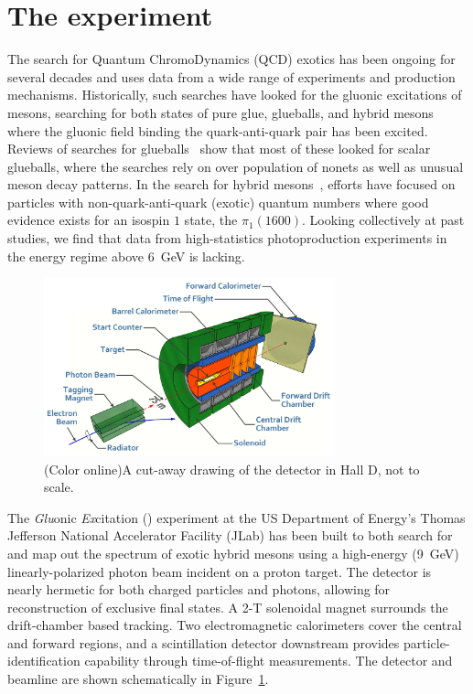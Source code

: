 \section[The \gx{} experiment]{\label{sec:gluexexperiment} The \gx{} experiment}
The search for Quantum ChromoDynamics (QCD) exotics has been ongoing for several decades and uses data from a wide range of experiments and production mechanisms. Historically, such searches have looked for the gluonic excitations of mesons, searching for both states of pure glue, glueballs, and hybrid mesons where the gluonic field binding the quark-anti-quark pair has been excited. Reviews of searches for glueballs~\cite{Crede:2008vw} show that most of these looked for scalar glueballs, where the searches rely on over population of nonets as well as unusual meson decay patterns. In the search for hybrid mesons~\cite{Meyer:2010ku,Meyer:2015eta}, efforts have focused on particles with non-quark-anti-quark (exotic) quantum numbers where good evidence exists for an isospin $1$ state, the $\pi_{1}(1600)$. Looking collectively at past studies, we find that data from high-statistics photoproduction experiments in the energy regime above $6$~GeV is lacking. 

\begin{figure}[h!]\centering
\includegraphics[width=0.75\textwidth]{figures/GlueX-graphic.jpg}
\caption[]{\label{fig:gluex_cut-away}(Color online)A cut-away drawing of the \GX{} detector in Hall D, not to scale.}
\end{figure}
The \emph{Glu}onic \emph{Ex}citation (\gx{}) experiment at the 
US Department of Energy's Thomas Jefferson National Accelerator Facility (JLab) \cite{jlab-ref} has been built to both search for and map out the spectrum of exotic hybrid mesons using a high-energy (9~GeV) linearly-polarized photon beam incident on a proton target\cite{gluex-ref}. The detector is nearly hermetic for both charged particles and photons, allowing for reconstruction of exclusive final states. A 2-T solenoidal magnet surrounds the drift-chamber based tracking. Two electromagnetic calorimeters cover the central and forward regions, and a scintillation detector downstream provides particle-identification capability through time-of-flight measurements. The \gx{} detector and beamline are shown schematically in Figure~\ref{fig:gluex_cut-away}.


